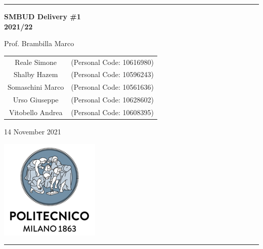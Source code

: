 \documentclass{article}
\begin{document}
\setlength\parindent{0pt} %
\setlength\parskip{1em}

\begin{titlepage}
	\centering
	\hrule
			
	\vspace{4,0cm}
	{\Huge \textbf{SMBUD Delivery \#1\\
		2021/22}\\}
						
		\vspace{0,5cm}
		\large {Prof. Brambilla Marco}
						
		\vspace{3,5cm}
		{
			\large
			\begin{tabular}{c c}
				Reale Simone     & (Personal Code: 10616980) \\
				Shalby Hazem     & (Personal Code: 10596243) \\
				Somaschini Marco & (Personal Code: 10561636) \\
				Urso Giuseppe    & (Personal Code: 10628602) \\
				Vitobello Andrea & (Personal Code: 10608395) \\
			\end{tabular}
									
		}
		\vspace{4cm}
						
		\normalsize{14 November 2021}
		\vspace{0,2cm}
					
		\centering\hspace{0,2cm}\includegraphics[scale=0.6]{./logo.png}
		\vspace{1,0cm}
						
						
		\hrule
						
		\end{titlepage}
		\pagebreak

        \tableofcontents

        \pagebreak
						
\end{document}
